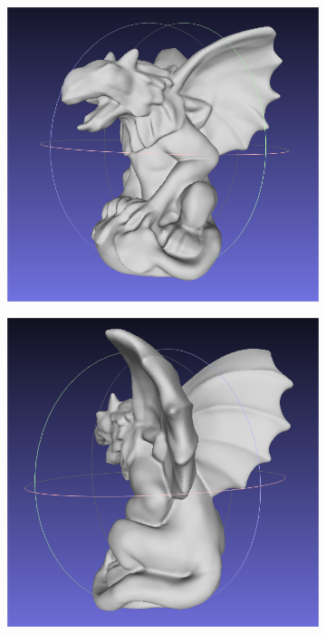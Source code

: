 \documentclass{ctexart}
\begin{document}
\begin{figure}[htbp]
\begin{subfigure}[htbp]{0.24\linewidth}
        \includegraphics[width=0.9\linewidth]{figures/2.png}
    \end{subfigure}
    \begin{subfigure}[htbp]{0.24\linewidth}
        \centering
        \includegraphics[width=0.9\linewidth]{figures/3.png}
    \end{subfigure}
    \begin{subfigure}[htbp]{0.24\linewidth}
        \centering

\end{subfigure}
\end{figure}
\end{document}
